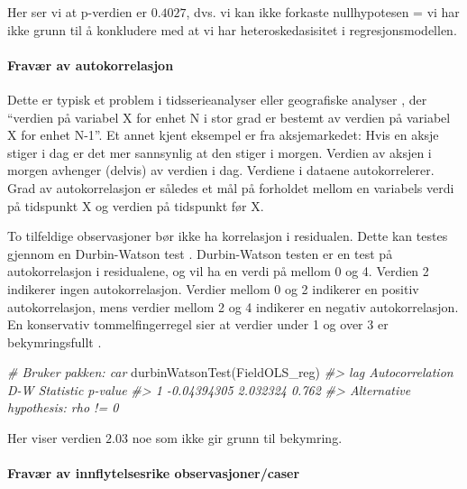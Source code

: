 \documentclass[
]{article}
\newenvironment{Shaded}{\begin{snugshade}}{\end{snugshade}}
\newcommand{\CommentTok}[1]{\textcolor[rgb]{0.56,0.35,0.01}{\textit{#1}}}
\newcommand{\FunctionTok}[1]{\textcolor[rgb]{0.00,0.00,0.00}{#1}}
\newcommand{\NormalTok}[1]{#1}
\begin{document}
Her ser vi at p-verdien er \(0.4027\), dvs. vi kan ikke forkaste nullhypotesen = vi har ikke grunn til å konkludere med at vi har heteroskedasisitet i regresjonsmodellen.

\hypertarget{fravuxe6r-av-autokorrelasjon}{%
\paragraph{Fravær av autokorrelasjon}\label{fravuxe6r-av-autokorrelasjon}}

Dette er typisk et problem i tidsserieanalyser eller geografiske analyser \citep[a.124]{eikemoKvantitativAnalyseMed2007}, der ``verdien på variabel X for enhet N i stor grad er bestemt av verdien på variabel X for enhet N-1''. Et annet kjent eksempel er fra aksjemarkedet: Hvis en aksje stiger i dag er det mer sannsynlig at den stiger i morgen. Verdien av aksjen i morgen avhenger (delvis) av verdien i dag. Verdiene i dataene autokorrelerer. Grad av autokorrelasjon er således et mål på forholdet mellom en variabels verdi på tidspunkt X og verdien på tidspunkt før X.

To tilfeldige observasjoner bør ikke ha korrelasjon i residualen. Dette kan testes gjennom en Durbin-Watson test \citep{durbinTestingSerialCorrelation1951}.
Durbin-Watson testen er en test på autokorrelasjon i residualene, og vil ha en verdi på mellom 0 og 4. Verdien 2 indikerer ingen autokorrelasjon. Verdier mellom 0 og 2 indikerer en positiv autokorrelasjon, mens verdier mellom 2 og 4 indikerer en negativ autokorrelasjon. En konservativ tommelfingerregel sier at verdier under 1 og over 3 er bekymringsfullt \citep{fieldDiscoveringStatisticsUsing2012}.

\begin{Shaded}
\begin{Highlighting}[]
\CommentTok{\# Bruker pakken: car}
\FunctionTok{durbinWatsonTest}\NormalTok{(FieldOLS\_reg)}
\CommentTok{\#\textgreater{}  lag Autocorrelation D{-}W Statistic p{-}value}
\CommentTok{\#\textgreater{}    1     {-}0.04394305      2.032324   0.762}
\CommentTok{\#\textgreater{}  Alternative hypothesis: rho != 0}
\end{Highlighting}
\end{Shaded}

Her viser verdien \(2.03\) noe som ikke gir grunn til bekymring.

\hypertarget{fravuxe6r-av-innflytelsesrike-observasjonercaser}{%
\paragraph{Fravær av innflytelsesrike observasjoner/caser}\label{fravuxe6r-av-innflytelsesrike-observasjonercaser}}
\end{document}
